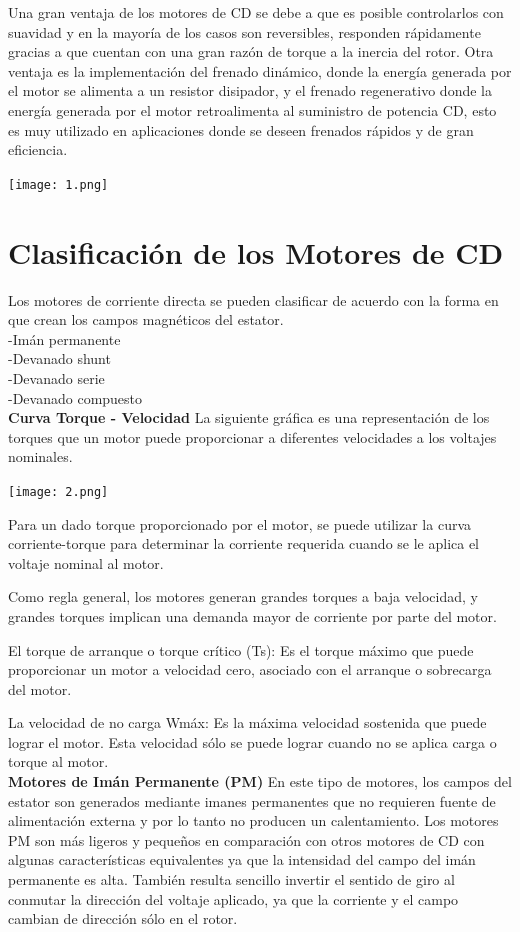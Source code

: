 \documentclass[10pt,a4paper]{article}
\begin{document}
Una gran ventaja de los motores de CD se debe a que es posible controlarlos con suavidad y en la mayoría de los casos son reversibles, responden rápidamente gracias a que cuentan con una gran razón de torque a la inercia del rotor. Otra ventaja es la implementación del frenado dinámico, donde la energía generada por el motor se alimenta a un resistor disipador, y el frenado regenerativo donde la energía generada por el motor retroalimenta al suministro de potencia CD, esto es muy utilizado en aplicaciones donde se deseen frenados rápidos y de gran eficiencia.

\begin{center}
\texttt{[image: 1.png]} 
\end{center}

\section{Clasificación de los Motores de CD}
Los motores de corriente directa se pueden clasificar de acuerdo con la forma en que crean los campos magnéticos del estator.\\
-Imán permanente\\
-Devanado shunt\\
-Devanado serie\\
-Devanado compuesto\\
\textbf{Curva Torque - Velocidad}
La siguiente gráfica es una representación de los torques que un motor puede proporcionar a diferentes velocidades a los voltajes nominales.\\

\begin{center}
\texttt{[image: 2.png]} 
\end{center}

Para un dado torque proporcionado por el motor, se puede utilizar la curva corriente-torque para determinar la corriente requerida cuando se le aplica el voltaje nominal al motor.  

Como regla general, los motores generan grandes torques a baja velocidad, y grandes torques implican una demanda mayor de corriente por parte del motor.

El torque de arranque o torque crítico (Ts): Es el torque máximo que puede proporcionar un motor a velocidad cero, asociado con el arranque o sobrecarga del motor.

La velocidad de no carga Wmáx: Es la máxima velocidad sostenida que puede lograr el motor. Esta velocidad sólo se puede lograr cuando no se aplica carga o torque al motor.\\
\textbf{Motores de Imán Permanente (PM)}
En este tipo de motores, los campos del estator son generados mediante imanes permanentes que no requieren fuente de alimentación externa y por lo tanto no producen un calentamiento. Los motores PM son más ligeros y pequeños en comparación con otros motores de CD con algunas características equivalentes ya que la intensidad del campo del imán permanente es alta. También resulta sencillo invertir el sentido de giro al conmutar la dirección del voltaje aplicado, ya que la corriente y el campo cambian de dirección sólo en el rotor.
\end{document}
